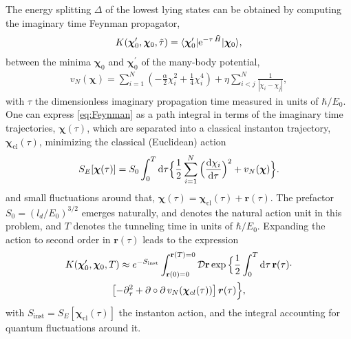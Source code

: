 \documentclass[aps, prb, floatfix, twocolumn, notitlepage, superscriptaddress, 10pt]{revtex4-2}
\def \ttau {{\tau}}
\newcommand{\n}{N}
\newcommand{\e}{\text e}
\newcommand{\tT}{T}
\newcommand{\bchi}{\boldsymbol \chi}
\newcommand{\br}{\mathbf r}
\newcommand{\1}{{1\hspace*{-0.5ex} \textrm{l} \hspace*{0.5ex}}}
\newcommand{\cD}{{\cal D}}
\begin{document}
The energy splitting $\Delta$ of the lowest lying states can be obtained by computing the imaginary time  Feynman propagator, 
\begin{gather}
K(\mathbold{\chi}_0^\prime, \mathbold{\chi}_0, \tilde{\tau}) = \langle \mathbold{\chi}_0^\prime \vert \e^{- \ttau \,\tilde{H}} \vert \mathbold{\chi}_0 \rangle,
\label{eq:Feynman}
\end{gather}
between the minima $\mathbold{\chi}_0$ and  $\mathbold{\chi}_0^\prime$
of the many-body potential, 
\begin{gather}
	v_\n(\bchi) = \sum_{i=1}^\n \left(-\frac{\alpha}{2} \chi_i^2 + \frac{1}{4} \chi_i^4   \right) + \eta \sum_{i < j}^\n \frac{1}{|\chi_i - \chi_j |},\label{eq:v_N}
\end{gather}
with $\ttau$     the dimensionless imaginary propagation time measured in units of $  \hbar/E_0$. %
One can  express  \eqref{eq:Feynman} as a path integral in terms of the imaginary time trajectories, $ \mathbold{\chi}( \ttau)$, 
which  are separated into a classical instanton trajectory, $\bchi_\text{cl}(\ttau) $, 
minimizing  the classical (Euclidean) action
\begin{equation}\label{eq:ImagAction}
	S_E[\bchi(\ttau)]  = S_0 \int_0^{T} {\rm{d}}   \ttau \Big\{ {1\over 2}\sum_{i = 1}^\n\Big( \frac{{\rm{d}} \chi_i}{{\rm{d}}  \ttau} \Big)^2 + v_\n(\bchi)   \Big \}.
\end{equation}
and small fluctuations around that,   $ \bchi(\ttau) = \bchi_\text{cl}(\ttau)  + \br(\ttau) $. 
The prefactor $S_0 = (l_d / E_0)^{3/2}$ emerges naturally, and denotes  the natural action 
unit in this problem, and ${T}$ denotes the tunneling time in units of $\hbar/E_0$. 
Expanding the action to second order in $ \br(\tau) $  leads to the expression
 \begin{gather}
	K(\bchi_0', \bchi_0, \tT) \approx 
	 e^{-S_{\text{inst}}} \int_{\br(0) = 0}^{\br(\tT) = 0} \cD\br \exp  \Big\{ \frac{1}{2} \int_{0}^{\tT} {\rm{d}} \ttau \, 
	 \br(\ttau)\cdot\nonumber \\
	  \left[ -\partial^2_{\ttau}
	 + \partial \circ %
	 \partial \, v_\n(\bchi_{cl}(\ttau)) \right] 
	 \mathbold{r}(\ttau)
	\Big \}, 
	 \label{eq:K_full}
\end{gather}
with $S_{\text{inst}} = S_E [\bchi_\text{cl}(\ttau)]$ the instanton action, and the  integral accounting for quantum fluctuations around it.
\end{document}
